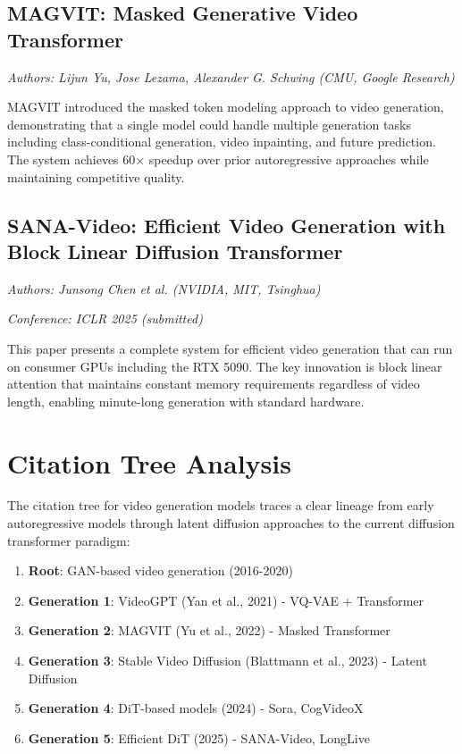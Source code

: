 \subsection{MAGVIT: Masked Generative Video Transformer}

\textit{Authors: Lijun Yu, Jose Lezama, Alexander G. Schwing (CMU, Google Research)}

MAGVIT introduced the masked token modeling approach to video generation, demonstrating that a single model could handle multiple generation tasks including class-conditional generation, video inpainting, and future prediction. The system achieves 60× speedup over prior autoregressive approaches while maintaining competitive quality.

\subsection{SANA-Video: Efficient Video Generation with Block Linear Diffusion Transformer}

\textit{Authors: Junsong Chen et al. (NVIDIA, MIT, Tsinghua)}

\textit{Conference: ICLR 2025 (submitted)}

This paper presents a complete system for efficient video generation that can run on consumer GPUs including the RTX 5090. The key innovation is block linear attention that maintains constant memory requirements regardless of video length, enabling minute-long generation with standard hardware.

\section{Citation Tree Analysis}

The citation tree for video generation models traces a clear lineage from early autoregressive models through latent diffusion approaches to the current diffusion transformer paradigm:

\begin{enumerate}
    \item \textbf{Root}: GAN-based video generation (2016-2020)
    \item \textbf{Generation 1}: VideoGPT (Yan et al., 2021) - VQ-VAE + Transformer
    \item \textbf{Generation 2}: MAGVIT (Yu et al., 2022) - Masked Transformer
    \item \textbf{Generation 3}: Stable Video Diffusion (Blattmann et al., 2023) - Latent Diffusion
    \item \textbf{Generation 4}: DiT-based models (2024) - Sora, CogVideoX
    \item \textbf{Generation 5}: Efficient DiT (2025) - SANA-Video, LongLive
\end{enumerate}

